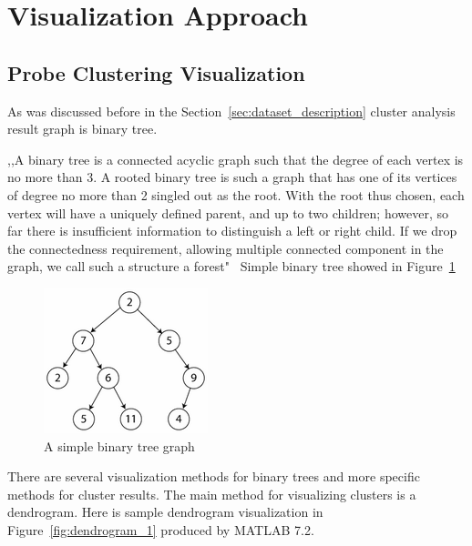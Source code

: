 \section{Visualization Approach}
\label{sec:solution}

\subsection{Probe Clustering Visualization}
\label{sec:probe}

As was discussed before in the Section~\ref{sec:dataset_description} cluster analysis result graph is binary tree.

,,A binary tree is a connected acyclic graph such that the degree of each vertex is no more than 3. A rooted binary tree is such a graph that has one of its vertices of degree no more than 2 singled out as the root. With the root thus chosen, each vertex will have a uniquely defined parent, and up to two children; however, so far there is insufficient information to distinguish a left or right child. If we drop the connectedness requirement, allowing multiple connected component in the graph, we call such a structure a forest"~\cite{BINARY_TREE} Simple binary tree showed in Figure~\ref{fig:simple_binary_tree}

\begin{figure}[h!]
\centering
\includegraphics[scale=1.0]{pictures/simple_binary_tree.png}
\caption{A simple binary tree graph}
\label{fig:simple_binary_tree}
\end{figure}

There are several visualization methods for binary trees and more specific methods for cluster results. The main method for visualizing clusters is a dendrogram. Here is sample dendrogram visualization in Figure~\ref{fig:dendrogram_1} produced by MATLAB 7.2.

